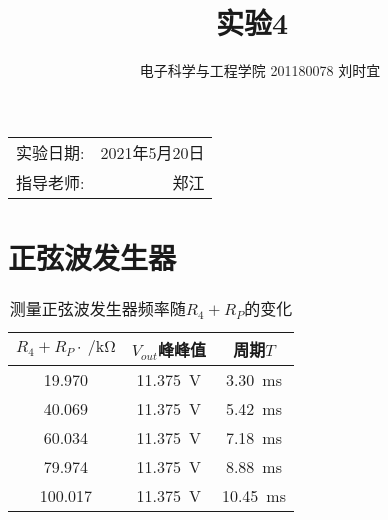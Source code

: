 \documentclass[UTF8]{ctexart}
\title{\textbf{实验4\ }} %
\author{电子科学与工程学院 201180078 刘时宜} %
\date{} %
\numberwithin{figure}{subsection}
\numberwithin{table}{subsection}
\numberwithin{equation}{subsection}
\begin{document}
\pagestyle{EE_template}

\maketitle %

\begin{center}
\begin{tabular}{l r}
实验日期: & 2021年5月20日 \\ %
指导老师: & 郑江 %
\end{tabular}
\end{center}



\section{正弦波发生器}

\begin{table}[h]
    \begin{center}
        \caption{测量正弦波发生器频率随\(R_4+R_P\)的变化}
        \begin{tabular}{|c|c|c|}
            \hline
            \(R_4+R_P\cdot \SI{}{\per\kilo\ohm}\) & \(V_{out}\)峰峰值 & 周期\(T\) \\
            \hline
            19.970 & \SI{11.375}{\volt} & \SI{3.30}{\milli\second} \\
            \hline
            40.069 & \SI{11.375}{\volt} & \SI{5.42}{\milli\second} \\
            \hline
            60.034 & \SI{11.375}{\volt} & \SI{7.18}{\milli\second} \\
            \hline
            79.974 & \SI{11.375}{\volt} & \SI{8.88}{\milli\second} \\
            \hline
            100.017 & \SI{11.375}{\volt} & \SI{10.45}{\milli\second} \\
            \hline
        \end{tabular}
    \end{center}
    \label{step wave f exp data}
\end{table}
\end{document}
